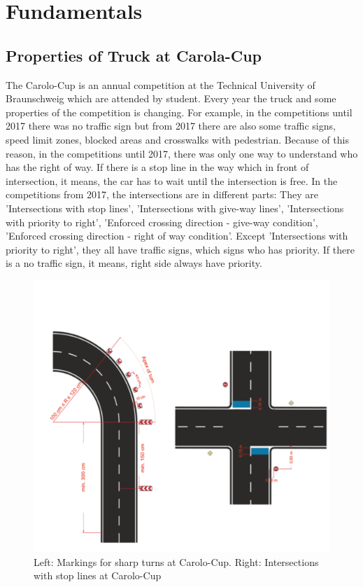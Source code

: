 %
\chapter{Fundamentals}\label{cha:Fundamentals}
%
%
\section{Properties of Truck at Carola-Cup}\label{sec:Properties of Truck at Carolo-Cup}
%
The Carolo-Cup is an annual competition at the Technical University of Braunschweig 
which are attended by student. Every year the truck and some properties of the 
competition is changing. For example, in the competitions until 2017 there was no 
traffic sign but from 2017 there are also some traffic signs, speed limit zones, 
blocked areas and crosswalks with pedestrian. Because of this reason, in the 
competitions until 2017, there was only one way to understand who has the right of way. 
If there is a stop line in the way which in front of intersection, it means, the car 
has to wait until the intersection is free. In the competitions from 2017, the 
intersections are in different parts: They are 'Intersections with stop lines', 
'Intersections with give-way lines', 'Intersections with priority to right', 
'Enforced crossing direction - give-way condition', 'Enforced crossing direction - 
right of way condition'. Except 'Intersections with priority to right', they all have 
traffic signs, which signs who has priority. If there is a no traffic sign, it means,
right side always have priority.



\begin{figure}[H]
	\centering
	\hspace*{0cm}   
	\includegraphics[width=120mm,scale=1]{./Bilder/Intersections.png}
	\caption{Left: Markings for sharp turns at Carolo-Cup.
Right: Intersections with stop lines at Carolo-Cup}
\end{figure}


